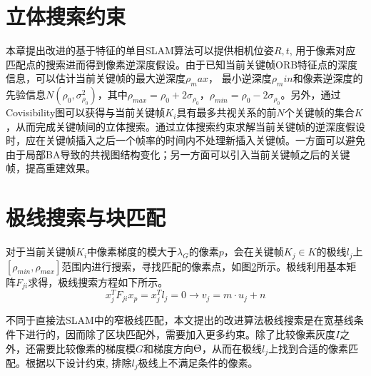 \begin{figure}
\label{fig1}

\end{figure}





\section{立体搜索约束}
本章提出改进的基于特征的单目SLAM算法可以提供相机位姿$R,t$, 用于像素对应匹配点的搜索进而得到像素逆深度假设。由于已知当前关键帧ORB特征点的深度信息，可以估计当前关键帧的最大逆深度$\rho_max$， 最小逆深度$\rho_min$和像素逆深度的先验信息$N\left( \rho_0,\sigma_{\rho_0}^2  \right)$，其中$\rho_{max}=\rho_0+2\sigma_{\rho_0}$，$\rho_{min}=\rho_0-2\sigma_{\rho_0}$。另外，通过Covisibility图可以获得与当前关键帧$K_i$具有最多共视关系的前$N$个关键帧的集合$K$，从而完成关键帧间的立体搜索。通过立体搜索约束求解当前关键帧的逆深度假设时，应在关键帧插入之后一个帧率的时间内不处理新插入关键帧。一方面可以避免由于局部BA导致的共视图结构变化；另一方面可以引入当前关键帧之后的关键帧，提高重建效果。


\section{极线搜索与块匹配}
对于当前关键帧$K_i$中像素梯度的模大于$\lambda_G$的像素$p$，会在关键帧$K_j \in K$的极线$l_j$上$\left[ \rho_{min}, \rho_{max} \right]$范围内进行搜索，寻找匹配的像素点，如图\ref{fig4.1}所示。极线利用基本矩阵$F_{ji}$求得，极线搜索方程如下所示。
\begin{equation}
\label{equ4.1}
x_j^T F_{ji}x_p = x^T_jl_j=0 \rightarrow v_j = m \cdot u_j+n
\end{equation}

\begin{figure}
\label{fig4.1}

\end{figure}

不同于直接法SLAM中的窄极线匹配，本文提出的改进算法极线搜索是在宽基线条件下进行的，因而除了区块匹配外，需要加入更多约束。除了比较像素灰度$I$之外，还需要比较像素的梯度模$G$和梯度方向$\Uptheta$，从而在极线$l_j$上找到合适的像素匹配。根据以下设计约束, 排除$l_j$极线上不满足条件的像素。


